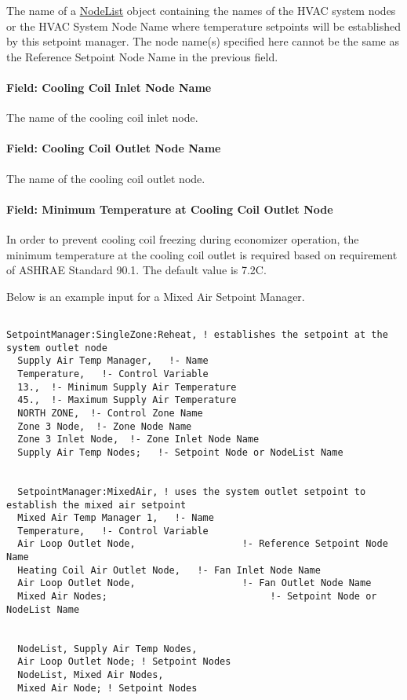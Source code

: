 The name of a \hyperref[nodelist]{NodeList} object containing the names of the HVAC system nodes or the HVAC System Node Name where temperature setpoints will be established by this setpoint manager. The node name(s) specified here cannot be the same as the Reference Setpoint Node Name in the previous field.

\paragraph{Field: Cooling Coil Inlet Node Name}\label{field-cooling-coil-inlet-node-name}

The name of the cooling coil inlet node.

\paragraph{Field: Cooling Coil Outlet Node Name}\label{field-cooling-coil-outlet-node-name}

The name of the cooling coil outlet node.

\paragraph{Field: Minimum Temperature at Cooling Coil Outlet Node}\label{field-minimum-temperature-at-cooling-coil-outlet-node}

In order to prevent cooling coil freezing during economizer operation, the minimum temperature at the cooling coil outlet is required based on requirement of ASHRAE Standard 90.1. The default value is 7.2C.

Below is an example input for a Mixed Air Setpoint Manager.

\begin{lstlisting}

SetpointManager:SingleZone:Reheat, ! establishes the setpoint at the system outlet node
  Supply Air Temp Manager,   !- Name
  Temperature,   !- Control Variable
  13.,  !- Minimum Supply Air Temperature
  45.,  !- Maximum Supply Air Temperature
  NORTH ZONE,  !- Control Zone Name
  Zone 3 Node,  !- Zone Node Name
  Zone 3 Inlet Node,  !- Zone Inlet Node Name
  Supply Air Temp Nodes;   !- Setpoint Node or NodeList Name


  SetpointManager:MixedAir, ! uses the system outlet setpoint to establish the mixed air setpoint
  Mixed Air Temp Manager 1,   !- Name
  Temperature,   !- Control Variable
  Air Loop Outlet Node,                   !- Reference Setpoint Node Name
  Heating Coil Air Outlet Node,   !- Fan Inlet Node Name
  Air Loop Outlet Node,                   !- Fan Outlet Node Name
  Mixed Air Nodes;                             !- Setpoint Node or NodeList Name


  NodeList, Supply Air Temp Nodes,
  Air Loop Outlet Node; ! Setpoint Nodes
  NodeList, Mixed Air Nodes,
  Mixed Air Node; ! Setpoint Nodes
\end{lstlisting}

